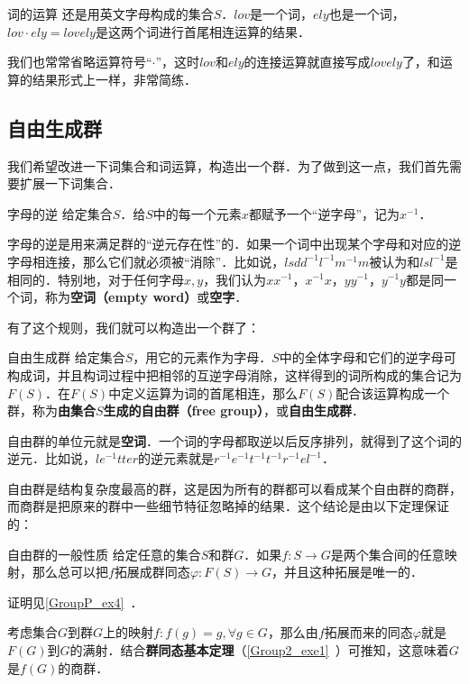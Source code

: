 \begin{example}{词的运算}
还是用英文字母构成的集合$S$．$lov$是一个词，$ely$也是一个词，$lov\cdot ely=lovely$是这两个词进行首尾相连运算的结果．
\end{example}

我们也常常省略运算符号“$\cdot$”，这时$lov$和$ely$的连接运算就直接写成$lovely$了，和运算的结果形式上一样，非常简练．

\subsection{自由生成群}

我们希望改进一下词集合和词运算，构造出一个群．为了做到这一点，我们首先需要扩展一下词集合．

\begin{definition}{字母的逆}
给定集合$S$．给$S$中的每一个元素$x$都赋予一个“逆字母”，记为$x^{-1}$．
\end{definition}

字母的逆是用来满足群的“逆元存在性”的．如果一个词中出现某个字母和对应的逆字母相连接，那么它们就必须被“消除”．比如说，$lsdd^{-1}l^{-1}m^{-1}m$被认为和$lsl^{-1}$是相同的．特别地，对于任何字母$x, y$，我们认为$xx^{-1}$，$x^{-1}x$，$yy^{-1}$，$y^{-1}y$都是同一个词，称为\textbf{空词（empty word）}或\textbf{空字}．

有了这个规则，我们就可以构造出一个群了：

\begin{theorem}{自由生成群}
给定集合$S$，用它的元素作为字母．$S$中的全体字母和它们的逆字母可构成词，并且构词过程中把相邻的互逆字母消除，这样得到的词所构成的集合记为$F(S)$．在$F(S)$中定义运算为词的首尾相连，那么$F(S)$配合该运算构成一个群，称为\textbf{由集合$S$生成的自由群（free group）}，或\textbf{自由生成群}．
\end{theorem}

自由群的单位元就是\textbf{空词}．一个词的字母都取逆以后反序排列，就得到了这个词的逆元．比如说，$le^{-1}tter$的逆元素就是$r^{-1}e^{-1}t^{-1}t^{-1}r^{-1}el^{-1}$．

自由群是结构复杂度最高的群，这是因为所有的群都可以看成某个自由群的商群，而商群是把原来的群中一些细节特征忽略掉的结果．这个结论是由以下定理保证的：

\begin{theorem}{自由群的一般性质}\label{FreGrp_the1}
给定任意的集合$S$和群$G$．如果$f:S\rightarrow G$是两个集合间的任意映射，那么总可以把$f$拓展成群同态$\varphi:F(S)\rightarrow G$，并且这种拓展是唯一的．
\end{theorem}

证明见\autoref{GroupP_ex4}~．

考虑集合$G$到群$G$上的映射$f:f(g)=g, \forall g\in G$，那么由$f$拓展而来的同态$\varphi$就是$F(G)$到$G$的满射．结合\textbf{群同态基本定理}（\autoref{Group2_exe1}~）可推知，这意味着$G$是$f(G)$的商群．


